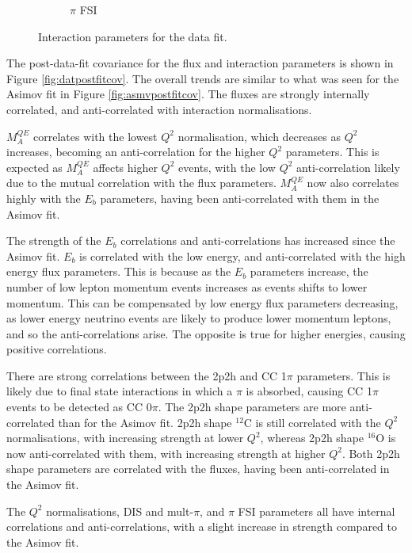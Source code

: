 \begin{figure}
\begin{subfigure}{0.49\textwidth}
  \caption{$\pi$ FSI}
  \label{fig:}
\end{subfigure}
\caption{Interaction parameters for the data fit.}
\label{fig:datxsec}
\end{figure}

The post-data-fit covariance for the flux and interaction parameters is shown in Figure \ref{fig:datpostfitcov}. The overall trends are similar to what was seen for the Asimov fit in Figure \ref{fig:asmvpostfitcov}. The fluxes are strongly internally correlated, and anti-correlated with interaction normalisations. 

$M^{QE}_A$ correlates with the lowest $Q^2$ normalisation, which decreases as $Q^2$ increases, becoming an anti-correlation for the higher $Q^2$ parameters. This is expected as $M^{QE}_A$ affects higher $Q^2$ events, with the low $Q^2$ anti-correlation likely due to the mutual correlation with the flux parameters. $M^{QE}_A$ now also correlates highly with the $E_b$ parameters, having been anti-correlated with them in the Asimov fit.

The strength of the $E_b$ correlations and anti-correlations has increased since the Asimov fit. $E_b$ is correlated with the low energy, and anti-correlated with the high energy flux parameters. This is because as the $E_b$ parameters increase, the number of low lepton momentum events increases as events shifts to lower momentum. This can be compensated by low energy flux parameters decreasing, as lower energy neutrino events are likely to produce lower momentum leptons, and so the anti-correlations arise. The opposite is true for higher energies, causing positive correlations.

There are strong correlations between the 2p2h and CC 1$\pi$ parameters. This is likely due to final state interactions in which a $\pi$ is absorbed, causing CC 1$\pi$ events to be detected as CC 0$\pi$. The 2p2h shape parameters are more anti-correlated than for the Asimov fit. 2p2h shape $^{12}$C is still correlated with the $Q^2$ normalisations, with increasing strength at lower $Q^2$, whereas 2p2h shape $^{16}$O is now anti-correlated with them, with increasing strength at higher $Q^2$. Both 2p2h shape parameters are correlated with the fluxes, having been anti-correlated in the Asimov fit.

The $Q^2$ normalisations, DIS and mult-$\pi$, and $\pi$ FSI parameters all have internal correlations and anti-correlations, with a slight increase in strength compared to the Asimov fit. 

